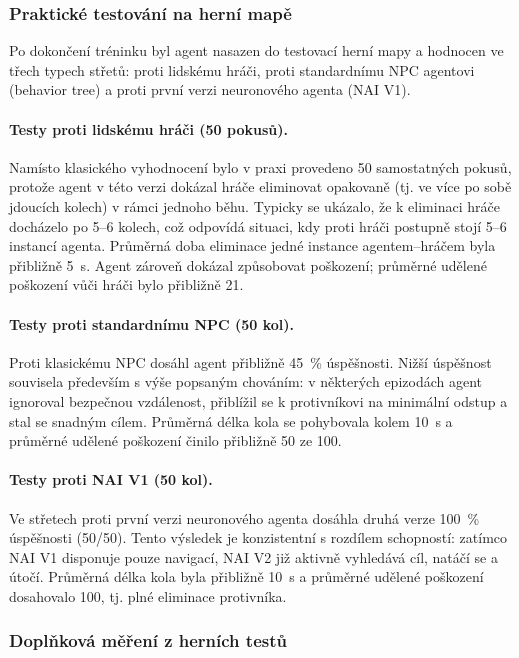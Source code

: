 \subsubsection{Praktické testování na herní mapě}

Po dokončení tréninku byl agent nasazen do testovací herní mapy a hodnocen ve třech typech střetů: proti lidskému hráči, proti standardnímu NPC agentovi (behavior tree) a proti první verzi neuronového agenta (NAI V1).

\paragraph{Testy proti lidskému hráči (50 pokusů).}
Namísto klasického vyhodnocení  bylo v praxi provedeno 50 samostatných pokusů, protože agent v této verzi dokázal hráče eliminovat opakovaně (tj. ve více po sobě jdoucích kolech) v rámci jednoho běhu. Typicky se ukázalo, že k eliminaci hráče docházelo po 5--6 kolech, což odpovídá situaci, kdy proti hráči postupně stojí 5--6 instancí agenta. Průměrná doba eliminace jedné instance agentem--hráčem byla přibližně 5~s. Agent zároveň dokázal způsobovat poškození; průměrné udělené poškození vůči hráči bylo přibližně 21.

\paragraph{Testy proti standardnímu NPC (50 kol).}
Proti klasickému NPC dosáhl agent přibližně 45~\% úspěšnosti. Nižší úspěšnost souvisela především s výše popsaným chováním: v některých epizodách agent ignoroval bezpečnou vzdálenost, přiblížil se k protivníkovi na minimální odstup a stal se snadným cílem. Průměrná délka kola se pohybovala kolem 10~s a průměrné udělené poškození činilo přibližně 50 ze 100.

\paragraph{Testy proti NAI V1 (50 kol).}
Ve střetech proti první verzi neuronového agenta dosáhla druhá verze 100~\% úspěšnosti (50/50). Tento výsledek je konzistentní s rozdílem schopností: zatímco NAI V1 disponuje pouze navigací, NAI V2 již aktivně vyhledává cíl, natáčí se a útočí. Průměrná délka kola byla přibližně 10~s a průměrné udělené poškození dosahovalo 100, tj. plné eliminace protivníka.

\newpage

\subsubsection{Doplňková měření z herních testů}

